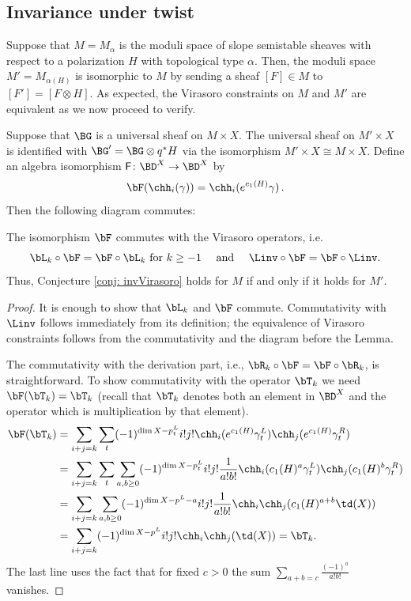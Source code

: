 \subsection{Invariance under twist}
\label{sec: invariancetwist}


Suppose that $M=M_\alpha$ is the moduli space of slope semistable sheaves with respect to a polarization $H$ with topological type $\alpha$. Then, the moduli space $M'=M_{\alpha(H)}$ is isomorphic to $M$ by sending a sheaf $[F]\in M$ to $[F']=[F\otimes H]$. As expected, the Virasoro constraints on $M$ and $M'$ are equivalent as we now proceed to verify.

Suppose that $\BG$ is a universal sheaf on $M\times X$. The universal sheaf on $M'\times X$ is identified with $\BG'=\BG\otimes q^\ast H$ via the isomorphism $M'\times X\cong M\times X$. Define an algebra isomorphism $\mathsf F\colon \BD^X\to \BD^X$ by
\[\bF(\chh_i(\gamma))=\chh_i(e^{c_1(H)} \gamma)\,.\]
Then the following diagram commutes:


\begin{lemma}
\notready\label{lem: twist}
The isomorphism $\bF$ commutes with the Virasoro operators, i.e.\[\bL_k\circ \bF=\bF\circ \bL_k\textup{ for $k\geq -1\quad$   and }\quad\Linv\circ \bF=\bF\circ \Linv.\]
Thus, Conjecture \ref{conj: invVirasoro} holds for $M$ if and only if it holds for $M'$.
\end{lemma}
\begin{proof}
It is enough to show that $\bL_k$ and $\bF$ commute. Commutativity with $\Linv$ follows immediately from its definition; the equivalence of Virasoro constraints follows from the commutativity and the diagram before the Lemma.

The commutativity with the derivation part, i.e., $\bR_k\circ \bF=\bF\circ \bR_k$, is straightforward. To show commutativity with the operator $\bT_k$ we need $\bF(\bT_k)=\bT_k$ (recall that $\bT_k$ denotes both an element in $\BD^X$ and the operator which is multiplication by that element).
\begin{align*}\bF(\bT_k)&=\sum_{i+j=k}\sum_t(-1)^{\dim X-p^L_t}i!j!\chh_i(e^{c_1(H)}\gamma_t^L)\chh_j(e^{c_1(H)}\gamma_t^R)\\
&=\sum_{i+j=k}\sum_t \sum_{a, b\geq 0}(-1)^{\dim X-p^L_t}i!j!\frac{1}{a!b!}\chh_i(c_1(H)^a\gamma_t^L)\chh_j(c_1(H)^b\gamma_t^R)\\
&=\sum_{i+j=k} \sum_{a, b\geq 0}(-1)^{\dim X-p^L-a}i!j!\frac{1}{a!b!}\chh_i\chh_j(c_1(H)^{a+b}\td(X))\\
&=\sum_{i+j=k} (-1)^{\dim X-p^L}i!j!\chh_i\chh_j(\td(X))=\bT_k.
\end{align*}
The last line uses the fact that for fixed $c>0$ the sum $\sum\limits_{a+b=c}\frac{(-1)^a}{a!b!}$ vanishes.\qedhere
\end{proof}



